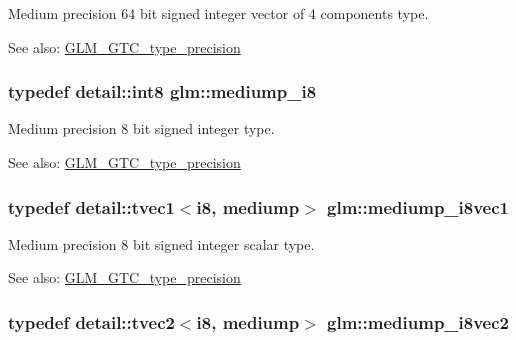 Medium precision 64 bit signed integer vector of 4 components type. \begin{Desc}
\item[See also:]\hyperlink{group__gtc__type__precision}{GLM\_\-GTC\_\-type\_\-precision} \end{Desc}
\hypertarget{group__gtc__type__precision_g28a8b5fd51072680bb55178c17cc7411}{
\subsubsection[mediump\_\-i8]{\setlength{\rightskip}{0pt plus 5cm}typedef detail::int8 {\bf glm::mediump\_\-i8}}}
\label{group__gtc__type__precision_g28a8b5fd51072680bb55178c17cc7411}


Medium precision 8 bit signed integer type. \begin{Desc}
\item[See also:]\hyperlink{group__gtc__type__precision}{GLM\_\-GTC\_\-type\_\-precision} \end{Desc}
\hypertarget{group__gtc__type__precision_g820f8b497e06d518968d00761747c547}{
\subsubsection[mediump\_\-i8vec1]{\setlength{\rightskip}{0pt plus 5cm}typedef detail::tvec1$<$i8, mediump$>$ {\bf glm::mediump\_\-i8vec1}}}
\label{group__gtc__type__precision_g820f8b497e06d518968d00761747c547}


Medium precision 8 bit signed integer scalar type. \begin{Desc}
\item[See also:]\hyperlink{group__gtc__type__precision}{GLM\_\-GTC\_\-type\_\-precision} \end{Desc}
\hypertarget{group__gtc__type__precision_g38eba1ab306fe5cc5eeafa35ce5b5b26}{
\subsubsection[mediump\_\-i8vec2]{\setlength{\rightskip}{0pt plus 5cm}typedef detail::tvec2$<$i8, mediump$>$ {\bf glm::mediump\_\-i8vec2}}}
\label{group__gtc__type__precision_g38eba1ab306fe5cc5eeafa35ce5b5b26}


